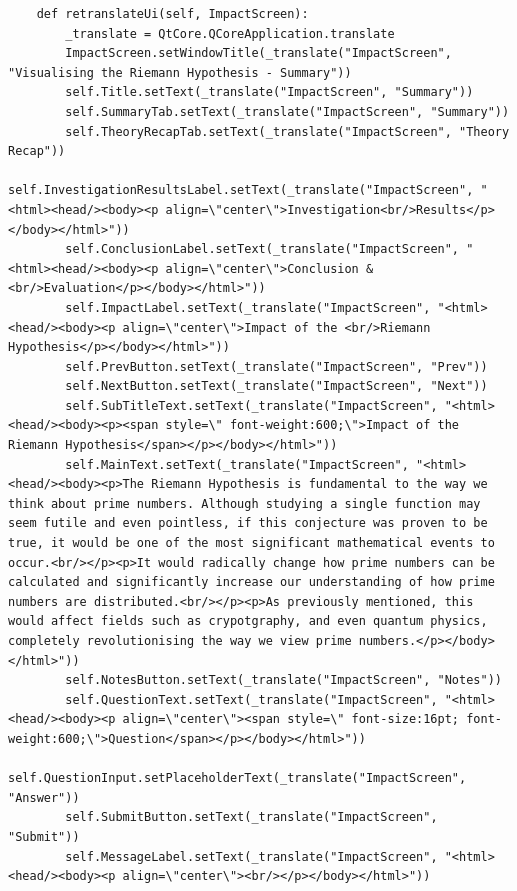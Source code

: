 \documentclass[12pt]{article}
\begin{document}
\begin{lstlisting}
    def retranslateUi(self, ImpactScreen):
        _translate = QtCore.QCoreApplication.translate
        ImpactScreen.setWindowTitle(_translate("ImpactScreen", "Visualising the Riemann Hypothesis - Summary"))
        self.Title.setText(_translate("ImpactScreen", "Summary"))
        self.SummaryTab.setText(_translate("ImpactScreen", "Summary"))
        self.TheoryRecapTab.setText(_translate("ImpactScreen", "Theory Recap"))
        self.InvestigationResultsLabel.setText(_translate("ImpactScreen", "<html><head/><body><p align=\"center\">Investigation<br/>Results</p></body></html>"))
        self.ConclusionLabel.setText(_translate("ImpactScreen", "<html><head/><body><p align=\"center\">Conclusion & <br/>Evaluation</p></body></html>"))
        self.ImpactLabel.setText(_translate("ImpactScreen", "<html><head/><body><p align=\"center\">Impact of the <br/>Riemann Hypothesis</p></body></html>"))
        self.PrevButton.setText(_translate("ImpactScreen", "Prev"))
        self.NextButton.setText(_translate("ImpactScreen", "Next"))
        self.SubTitleText.setText(_translate("ImpactScreen", "<html><head/><body><p><span style=\" font-weight:600;\">Impact of the Riemann Hypothesis</span></p></body></html>"))
        self.MainText.setText(_translate("ImpactScreen", "<html><head/><body><p>The Riemann Hypothesis is fundamental to the way we think about prime numbers. Although studying a single function may seem futile and even pointless, if this conjecture was proven to be true, it would be one of the most significant mathematical events to occur.<br/></p><p>It would radically change how prime numbers can be calculated and significantly increase our understanding of how prime numbers are distributed.<br/></p><p>As previously mentioned, this would affect fields such as crypotgraphy, and even quantum physics, completely revolutionising the way we view prime numbers.</p></body></html>"))
        self.NotesButton.setText(_translate("ImpactScreen", "Notes"))
        self.QuestionText.setText(_translate("ImpactScreen", "<html><head/><body><p align=\"center\"><span style=\" font-size:16pt; font-weight:600;\">Question</span></p></body></html>"))
        self.QuestionInput.setPlaceholderText(_translate("ImpactScreen", "Answer"))
        self.SubmitButton.setText(_translate("ImpactScreen", "Submit"))
        self.MessageLabel.setText(_translate("ImpactScreen", "<html><head/><body><p align=\"center\"><br/></p></body></html>"))
\end{lstlisting}
\end{document}
